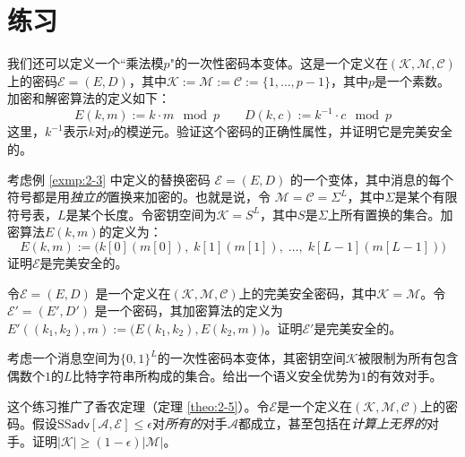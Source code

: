 \section{练习}

\begin{exercise}[乘性一次性密码本]\label{exer:2-1}
我们还可以定义一个``乘法模$p$"的一次性密码本变体。这是一个定义在$(\mathcal{K},\mathcal{M},\mathcal{C})$上的密码$\mathcal{E}=(E,D)$，其中$\mathcal{K}:=\mathcal{M}:=\mathcal{C}:=\{1,\dots,p-1\}$，其中$p$是一个素数。加密和解密算法的定义如下：
\[
E(k,m):=k\cdot m \mod p\quad\quad
D(k,c):=k^{-1}\cdot c \mod p
\]
这里，$k^{-1}$表示$k$对$p$的模逆元。验证这个密码的正确性属性，并证明它是完美安全的。
\end{exercise}

\begin{exercise}[一个好的替换密码]\label{exer:2-2}
考虑例 \ref{exmp:2-3} 中定义的替换密码 $\mathcal{E}=(E,D)$ 的一个变体，其中消息的每个符号都是用\emph{独立的}置换来加密的。也就是说，令 $\mathcal{M}=\mathcal{C}=\Sigma^L$，其中$\Sigma$是某个有限符号表，$L$是某个长度。令密钥空间为$\mathcal{K}=S^L$，其中$S$是$\Sigma$上所有置换的集合。加密算法$E(k, m)$的定义为：
\[
E(k,m):=\Big(k[0](m[0]),\;k[1](m[1]),\;\dots,\;k[L-1](m[L-1])\Big)
\]
证明$\mathcal{E}$是完美安全的。
\end{exercise}

\begin{exercise}[链式加密]\label{exer:2-3}
令$\mathcal{E}=(E,D)$ 是一个定义在$(\mathcal{K},\mathcal{M},\mathcal{C})$上的完美安全密码，其中$\mathcal{K}=\mathcal{M}$。令$\mathcal{E}'=(E',D')$ 是一个密码，其加密算法的定义为 $E'((k_1,k_2),m):=\big(E(k_1,k_2),E(k_2,m)\big)$。证明$\mathcal{E}'$是完美安全的。
\end{exercise}

\begin{exercise}[被破坏的一次性密码本]\label{exer:2-4}
考虑一个消息空间为$\{0,1\}^L$的一次性密码本变体，其密钥空间$\mathcal{K}$被限制为所有包含偶数个$1$的$L$比特字符串所构成的集合。给出一个语义安全优势为$1$的有效对手。
\end{exercise}

\begin{exercise}[更强的不可能结果]\label{exer:2-5}
这个练习推广了香农定理（定理 \ref{theo:2-5}）。令$\mathcal{E}$是一个定义在$(\mathcal{K},\mathcal{M},\mathcal{C})$上的密码。假设$\mathrm{SS}\mathsf{adv}[\mathcal{A},\mathcal{E}]\leq\epsilon$对\emph{所有的}对手$\mathcal{A}$都成立，甚至包括在\emph{计算上无界的}对手。证明$|\mathcal{K}|\geq(1-\epsilon)|\mathcal{M}|$。
\end{exercise}

